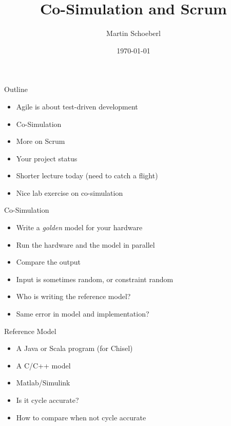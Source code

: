 

\newif\ifbook


\usepackage{tikz}
\usetikzlibrary{positioning, arrows.meta}


\title{Co-Simulation and Scrum}
\author{Martin Schoeberl}
\date{\today}



\begin{frame}
\titlepage
\end{frame}




\begin{frame}[fragile]{Outline}
\begin{itemize}
\item Agile is about test-driven development
\item Co-Simulation
\item More on Scrum
\item Your project status
\item Shorter lecture today (need to catch a flight)
\item Nice lab exercise on co-simulation
\end{itemize}
\end{frame}

\begin{frame}[fragile]{Co-Simulation}
\begin{itemize}
\item Write a \emph{golden} model for your hardware
\item Run the hardware and the model in parallel
\item Compare the output
\item Input is sometimes random, or constraint random
\item Who is writing the reference model?
\item Same error in model and implementation?
\end{itemize}
\end{frame}

\begin{frame}[fragile]{Reference Model}
\begin{itemize}
\item A Java or Scala program (for Chisel)
\item A C/C++ model
\item Matlab/Simulink
\item Is it cycle accurate?
\item How to compare when not cycle accurate
\end{itemize}
\end{frame}

